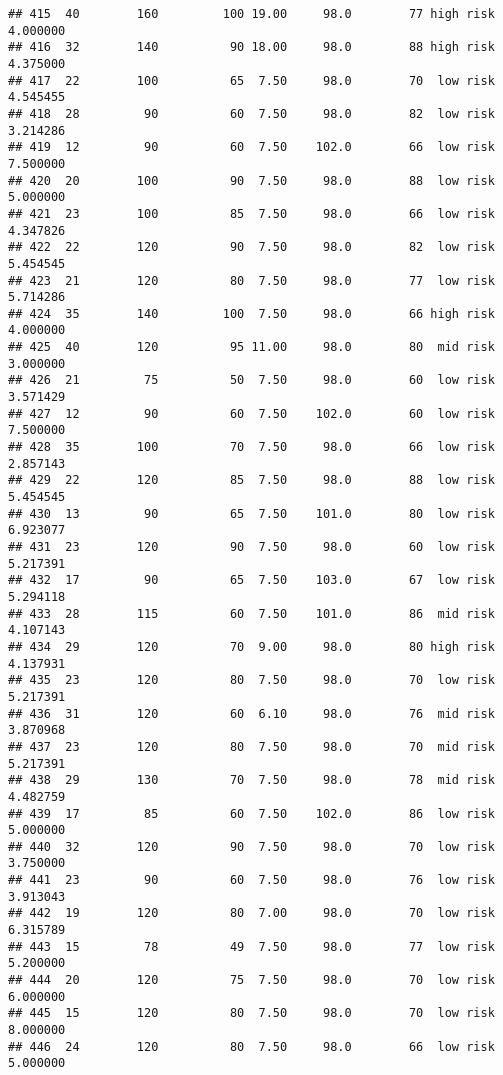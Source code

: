 \documentclass[
  ignorenonframetext,
]{beamer}
\begin{document}
\begin{frame}[fragile]
\begin{verbatim}
## 415  40        160         100 19.00     98.0        77 high risk      4.000000
## 416  32        140          90 18.00     98.0        88 high risk      4.375000
## 417  22        100          65  7.50     98.0        70  low risk      4.545455
## 418  28         90          60  7.50     98.0        82  low risk      3.214286
## 419  12         90          60  7.50    102.0        66  low risk      7.500000
## 420  20        100          90  7.50     98.0        88  low risk      5.000000
## 421  23        100          85  7.50     98.0        66  low risk      4.347826
## 422  22        120          90  7.50     98.0        82  low risk      5.454545
## 423  21        120          80  7.50     98.0        77  low risk      5.714286
## 424  35        140         100  7.50     98.0        66 high risk      4.000000
## 425  40        120          95 11.00     98.0        80  mid risk      3.000000
## 426  21         75          50  7.50     98.0        60  low risk      3.571429
## 427  12         90          60  7.50    102.0        60  low risk      7.500000
## 428  35        100          70  7.50     98.0        66  low risk      2.857143
## 429  22        120          85  7.50     98.0        88  low risk      5.454545
## 430  13         90          65  7.50    101.0        80  low risk      6.923077
## 431  23        120          90  7.50     98.0        60  low risk      5.217391
## 432  17         90          65  7.50    103.0        67  low risk      5.294118
## 433  28        115          60  7.50    101.0        86  mid risk      4.107143
## 434  29        120          70  9.00     98.0        80 high risk      4.137931
## 435  23        120          80  7.50     98.0        70  low risk      5.217391
## 436  31        120          60  6.10     98.0        76  mid risk      3.870968
## 437  23        120          80  7.50     98.0        70  mid risk      5.217391
## 438  29        130          70  7.50     98.0        78  mid risk      4.482759
## 439  17         85          60  7.50    102.0        86  low risk      5.000000
## 440  32        120          90  7.50     98.0        70  low risk      3.750000
## 441  23         90          60  7.50     98.0        76  low risk      3.913043
## 442  19        120          80  7.00     98.0        70  low risk      6.315789
## 443  15         78          49  7.50     98.0        77  low risk      5.200000
## 444  20        120          75  7.50     98.0        70  low risk      6.000000
## 445  15        120          80  7.50     98.0        70  low risk      8.000000
## 446  24        120          80  7.50     98.0        66  low risk      5.000000

\end{verbatim}
\end{frame}
\end{document}
